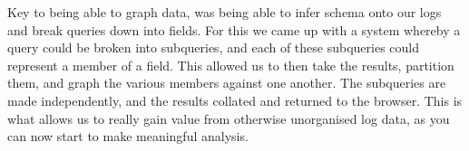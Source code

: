 Key to being able to graph data, was being able to infer
schema onto our logs and break queries down into fields. For
this we came up with a system whereby a query could be
broken into subqueries, and each of these subqueries could
represent a member of a field. This allowed us to then take
the results, partition them, and graph the various members
against one another. The subqueries are made independently,
and the results collated and returned to the browser. This
is what allows us to really gain value from otherwise
unorganised log data, as you can now start to make
meaningful analysis.

